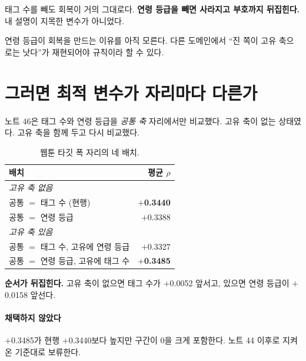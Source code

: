 \documentclass[10pt]{article}
\begin{document}
태그 수를 빼도 회복이 거의 그대로다. \textbf{연령 등급을 빼면 사라지고 부호까지
뒤집힌다.} 내 설명이 지목한 변수가 아니었다.

{연령 등급이 회복을 만드는 이유를 아직 모른다. 다른 도메인에서 ``진 쪽이 고유
축으로는 낫다''가 재현되어야 규칙이라 할 수 있다.}

\section{그러면 최적 변수가 자리마다 다른가}

노트 46은 태그 수와 연령 등급을 \emph{공통 축} 자리에서만 비교했다. 고유 축이
없는 상태였다. 고유 축을 함께 두고 다시 비교했다.

\begin{table}[t]
\centering\tsize
\caption{웹툰 타깃 폭 자리의 네 배치.}
\begin{tabular}{lr}
\toprule
배치 & 평균 $\rho$ \\
\midrule
\multicolumn{2}{l}{\emph{고유 축 없음}} \\
\quad 공통 $=$ 태그 수 (현행) & \textbf{$+$0.3440} \\
\quad 공통 $=$ 연령 등급 & $+$0.3388 \\
\midrule
\multicolumn{2}{l}{\emph{고유 축 있음}} \\
\quad 공통 $=$ 태그 수, 고유에 연령 등급 & $+$0.3327 \\
\quad 공통 $=$ 연령 등급, 고유에 태그 수 & \textbf{$+$0.3485} \\
\bottomrule
\end{tabular}
\end{table}

\textbf{순서가 뒤집힌다.} 고유 축이 없으면 태그 수가 $+$0.0052 앞서고, 있으면
연령 등급이 $+$0.0158 앞선다.


\paragraph{채택하지 않았다}
$+$0.3485가 현행 $+$0.3440보다 높지만 구간이 0을 크게 포함한다. 노트 44 이후로
지켜 온 기준대로 보류한다.
\end{document}

